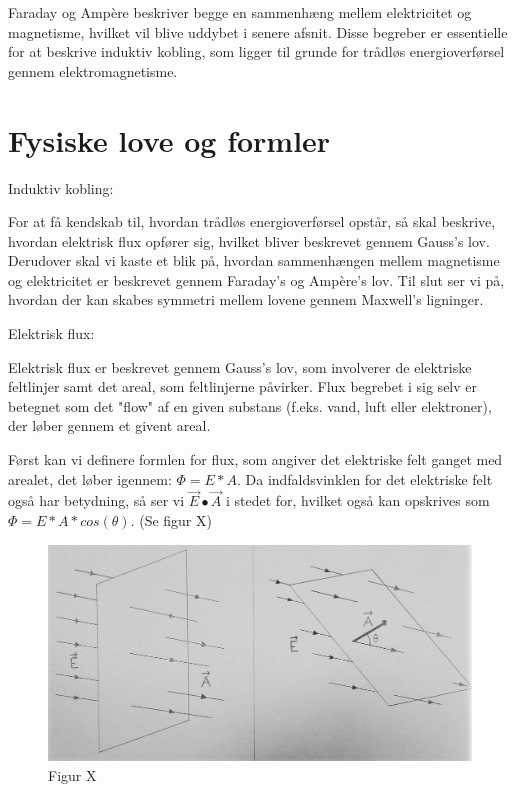 Faraday og Ampère beskriver begge en sammenhæng mellem elektricitet og magnetisme, hvilket vil blive uddybet i senere afsnit. Disse begreber er essentielle for at beskrive induktiv kobling, som ligger til grunde for trådløs energioverførsel gennem elektromagnetisme.

\chapter{Fysiske love og formler}

Induktiv kobling:

For at få kendskab til, hvordan trådløs energioverførsel opstår, så skal beskrive, hvordan elektrisk flux opfører sig, hvilket bliver beskrevet gennem Gauss's lov. Derudover skal vi kaste et blik på, hvordan sammenhængen mellem magnetisme og elektricitet er beskrevet gennem Faraday's og Ampère's lov. Til slut ser vi på, hvordan der kan skabes symmetri mellem lovene gennem Maxwell's ligninger.

Elektrisk flux:

Elektrisk flux er beskrevet gennem Gauss's lov, som involverer de elektriske feltlinjer samt det areal, som feltlinjerne påvirker. Flux begrebet i sig selv er betegnet som det "flow" af en given substans (f.eks. vand, luft eller elektroner), der løber gennem et givent areal.

Først kan vi definere formlen for flux, som angiver det elektriske felt ganget med arealet, det løber igennem: $\Phi = E * A$. Da indfaldsvinklen for det elektriske felt også har betydning, så ser vi $\vec{E} \bullet \vec{A}$ i stedet for, hvilket også kan opskrives som $\Phi = E * A * cos(\theta)$. (Se figur X)

\begin{figure}[H]
\centering
\includegraphics[scale=0.5]{Vildledning/Schematics/Vinkelflux}
\caption{Figur X}
\end{figure}

